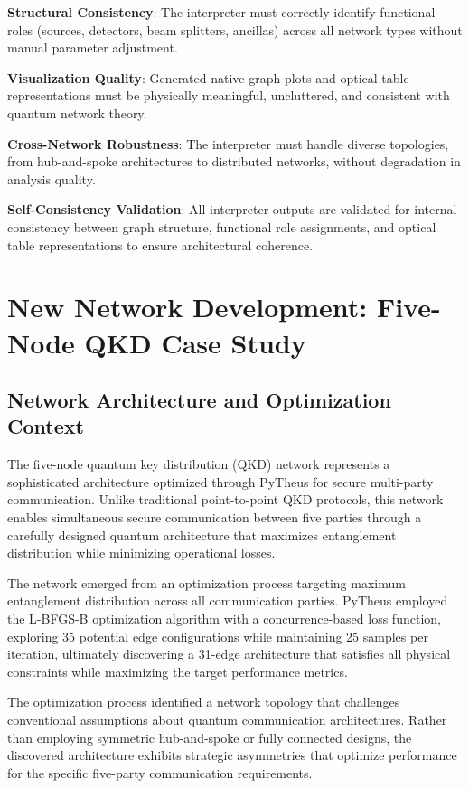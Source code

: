 \documentclass[11pt,a4paper]{article}
\begin{document}
\textbf{Structural Consistency}: The interpreter must correctly identify functional roles (sources, detectors, beam splitters, ancillas) across all network types without manual parameter adjustment.

\textbf{Visualization Quality}: Generated native graph plots and optical table representations must be physically meaningful, uncluttered, and consistent with quantum network theory.

\textbf{Cross-Network Robustness}: The interpreter must handle diverse topologies, from hub-and-spoke architectures to distributed networks, without degradation in analysis quality.

\textbf{Self-Consistency Validation}: All interpreter outputs are validated for internal consistency between graph structure, functional role assignments, and optical table representations to ensure architectural coherence.

\section{New Network Development: Five-Node QKD Case Study}

\subsection{Network Architecture and Optimization Context}

The five-node quantum key distribution (QKD) network represents a sophisticated architecture optimized through PyTheus for secure multi-party communication. Unlike traditional point-to-point QKD protocols, this network enables simultaneous secure communication between five parties through a carefully designed quantum architecture that maximizes entanglement distribution while minimizing operational losses.

The network emerged from an optimization process targeting maximum entanglement distribution across all communication parties. PyTheus employed the L-BFGS-B optimization algorithm with a concurrence-based loss function, exploring 35 potential edge configurations while maintaining 25 samples per iteration, ultimately discovering a 31-edge architecture that satisfies all physical constraints while maximizing the target performance metrics.

The optimization process identified a network topology that challenges conventional assumptions about quantum communication architectures. Rather than employing symmetric hub-and-spoke or fully connected designs, the discovered architecture exhibits strategic asymmetries that optimize performance for the specific five-party communication requirements.
\end{document}
